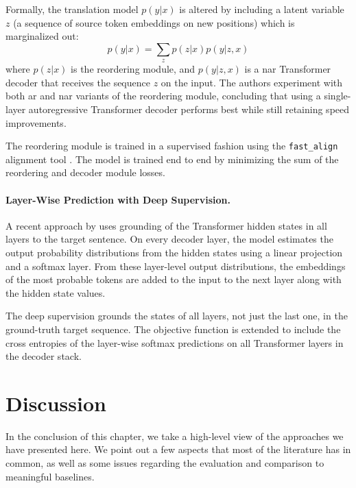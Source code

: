 Formally, the translation model $p(y|x)$ is altered by including a latent
variable $z$ (a sequence of source token embeddings on new positions) which is
marginalized out:
%
\begin{equation}
  p(y|x) = \sum_{z} p(z|x) p(y|z,x)
\end{equation}
%
where $p(z|x)$ is the reordering module, and $p(y|z,x)$ is a \ac{nar}
Transformer decoder that receives the sequence $z$ on the input. The authors
experiment with both \ac{ar} and \ac{nar} variants of the reordering module,
concluding that using a single-layer autoregressive Transformer decoder
performs best while still retaining speed improvements.

The reordering module is trained in a supervised fashion using the
\texttt{fast\_align} alignment tool \citep{dyer-etal-2013-simple}. The model is
trained end to end by minimizing the sum of the reordering and decoder module
losses.

\paragraph{Layer-Wise Prediction with Deep Supervision.}  %
A recent approach by \citet{huang-etal-2021-nonautoregressive} uses grounding
of the Transformer hidden states in all layers to the target sentence. On every
decoder layer, the model estimates the output probability distributions from
the hidden states using a linear projection and a softmax layer. From these
layer-level output distributions, the embeddings of the most probable tokens
are added to the input to the next layer along with the hidden state values.

The deep supervision grounds the states of all layers, not just the last one,
in the ground-truth target sequence. The objective function is extended to
include the cross entropies of the layer-wise softmax predictions on all
Transformer layers in the decoder stack.


\section{Discussion}%
\label{sec:nat:discussion}

In the conclusion of this chapter, we take a high-level view of the approaches
we have presented here. We point out a few aspects that most of the literature
has in common, as well as some issues regarding the evaluation and comparison
to meaningful baselines.

